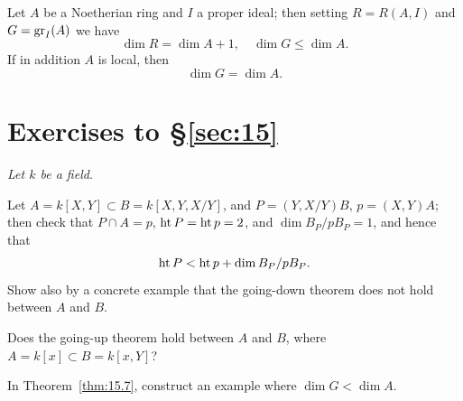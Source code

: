 \begin{theorem}\label{thm:15.7}
Let $A$ be a Noetherian ring and $I$ a proper ideal; then
setting $R = R(A, I)$ and $G = \operatorname{gr}_I(A)$ we have
\[
  \dim R = \dim A + 1, \quad \dim G \le \dim A.
\]
If in addition $A$ is local, then
\[
  \dim G = \dim A.
\]
\end{theorem}

\section*{Exercises to \S\ref{sec:15}}
\emph{Let $k$ be a field.}

\begin{exercise}\label{ex:15.1-ex}
Let $A = k[X, Y] \subset B = k[X, Y, X/Y]$, and $P = (Y, X/Y)B$, $p = (X, Y)A$;
then check that $P \cap A = p$, $\operatorname{ht} P = \operatorname{ht} p = 2$, and $\dim B_P/pB_P = 1$, and hence
that
\[
  \operatorname{ht} P < \operatorname{ht} p + \dim B_P/pB_P.
\]
Show also by a concrete example that the going-down theorem does not
hold between $A$ and $B$.
\end{exercise}

\begin{exercise}\label{ex:15.2-ex}
Does the going-up theorem hold between $A$ and $B$, where $A = k[x] \subset
B = k[x, Y]$?
\end{exercise}

\begin{exercise}\label{ex:15.3-ex}
In Theorem~\ref{thm:15.7}, construct an example where $\dim G < \dim A$.
\end{exercise}
